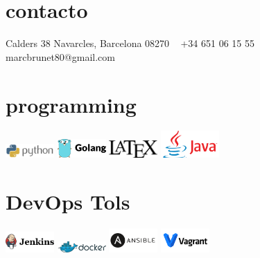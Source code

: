 \documentclass[]{cv-style}          %
\begin{document}
\lastupdated

\vspace{0.5cm}
\begin{aside}
%
\section{contacto}
Calders 38
Navarcles, Barcelona 08270
~
+34 651 06 15 55
~
marcbrunet80@gmail.com
%
%
\section{programming}
\includegraphics[width=5em]{programing/python.png}\smallskip
\includegraphics[width=5em]{programing/golang.png}\smallskip
\includegraphics[width=5em]{programing/Latex.png}\smallskip
\includegraphics[width=6em]{programing/java.png}
%
\section{DevOps Tols}
\includegraphics[width=5em]{devops/jenkins.png}\smallskip
\includegraphics[width=5em]{devops/docker.png}\smallskip
\includegraphics[width=5em]{devops/ansibl.png}\smallskip
\includegraphics[width=5em]{devops/vagrant.png}
\end{aside}
\end{document}
